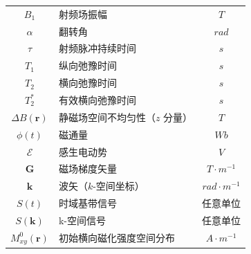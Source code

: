 \documentclass[12pt]{article}
\begin{document}
\begin{table}[h]
\begin{tabularx}{\textwidth}{c X c}
        $B_1$ & 射频场振幅 & $\si{T}$ \\
        $\alpha$ & 翻转角 & $\si{rad}$ \\
        $\tau$ & 射频脉冲持续时间 & $\si{s}$ \\
        $T_1$ & 纵向弛豫时间 & $\si{s}$ \\
        $T_2$ & 横向弛豫时间 & $\si{s}$ \\
        $T_2^*$ & 有效横向弛豫时间 & $\si{s}$ \\
        $\Delta B(\bm{r})$ & 静磁场空间不均匀性（$z$ 分量） & $\si{T}$ \\
        $\phi(t)$ & 磁通量 & $\si{Wb}$ \\
        $\mathcal{E}$ & 感生电动势 & $\si{V}$ \\
        $\bm{G}$ & 磁场梯度矢量 & $\si{T\cdot m^{-1}}$ \\
        $\bm{k}$ & 波矢（$k$-空间坐标） & $\si{rad\cdot m^{-1}}$ \\
        $S(t)$ & 时域基带信号 & 任意单位 \\
        $S(\bm{k})$ & k-空间信号 & 任意单位 \\
        $M_{xy}^0(\bm{r})$ & 初始横向磁化强度空间分布 & $\si{A\cdot m^{-1}}$ \\
        \bottomrule
    \end{tabularx}
\end{table}

\printbibliography
\end{document}
